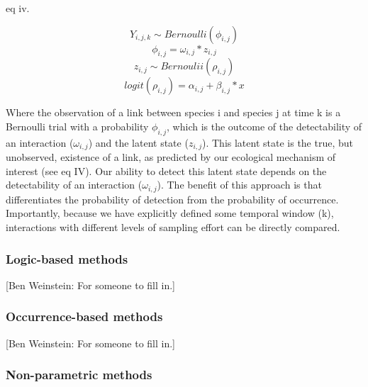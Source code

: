 eq iv.

\[ Y_{i,j,k} \sim Bernoulli(\phi_{i,j})\] \[ \phi_{i,j} = \omega_{i,j} *
z_{i,j}\] \[z_{i,j} \sim Bernoulii(\rho_{i,j})\] \[ logit(\rho_{i,j}) =
\alpha_{i,j} + \beta_{i,j} * x \]

Where the observation of a link between species i and species j at time k is a
Bernoulli trial with a probability \(\phi_{i,j}\), which is the outcome of the
detectability of an interaction (\(\omega_{i,j}\)) and the latent state
(\(z_{i,j}\)). This latent state is the true, but unobserved, existence of a
link, as predicted by our ecological mechanism of interest (see eq IV). Our
ability to detect this latent state depends on the detectability of an
interaction (\(\omega_{i,j}\)). The benefit of this approach is that
differentiates the probability of detection from the probability of occurrence.
Importantly, because we have explicitly defined some temporal window (k),
interactions with different levels of sampling effort can be directly compared.

\subsubsection*{Logic-based methods}\label{logic-based-methods}

{[}Ben Weinstein: For someone to fill in.{]}

\subsubsection*{Occurrence-based methods}\label{occurrence-based-methods}

{[}Ben Weinstein: For someone to fill in.{]}

\subsubsection*{Non-parametric methods}\label{non-parametric-methods}

